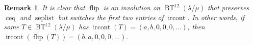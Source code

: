 \documentclass[12pt]{article}
\theoremstyle{plain}
\newtheorem{remark}[theorem]{Remark}
\theoremstyle{definition}
\def\ircont{{\operatorname{ircont}}}
\def\BenignTables{{\operatorname{BT}^{12}\left(  \lambda/\mu\right)}}
\begin{document}
\begin{comment}
For example,
\[
\text{if } T \text { is }
\ytableausetup{notabloids}
\begin{ytableau}
\none& 1 & 1 & 2 & 1 \\
1 & 1 & 1 \\
1 & 2 & 1 \\
1 & 2 \\
2
\end{ytableau}
\text{ , then }\operatorname*{flip}\left(  T\right)\text{ is }
\ytableausetup{notabloids}
\begin{ytableau}
\none& 1 & 2 & 1 & 2 \\
1 & 1 & 2 \\
1 & 2 & 2 \\
1 & 2 \\
2
\end{ytableau}
.
\]

\end{comment}

\begin{remark}
 \label{pf.lem.BK.flip.ircont}
It is clear that $\operatorname*{flip}$ is an involution on $\BenignTables$ that preserves $\operatorname*{ceq}$ and $\operatorname*{seplist}$ but switches the first two entries of $\operatorname*{ircont}$. In other words, if some $T \in \BenignTables$ has $\ircont\left(T\right) = \left(a,b,0,0,0,\ldots\right)$, then
$\operatorname{ircont}\left(\operatorname{flip}\left(T\right)\right) = \left(b,a,0,0,0,\ldots\right)$.
\end{remark}
\end{document}
